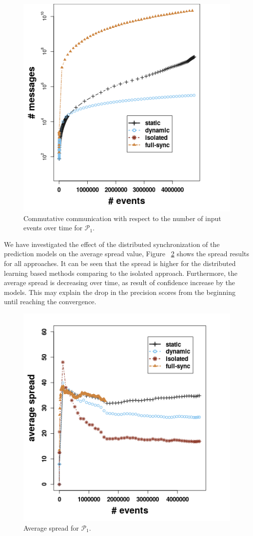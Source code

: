 \begin{center}
	
	\begin{figure}[h]
		
		\includegraphics[width=.5\textwidth]{figures/communication.png}
		
		\caption{Commutative communication with respect to the number of input events over time for $\mathcal{P}_1$.}
		\label{fig:comm}
	\end{figure}
\end{center}


We have investigated the effect of the distributed synchronization of the prediction models on the average spread value, Figure  ~\ref{fig:spread}  shows the spread results for all approaches. It can be seen that the spread is higher for the distributed learning based methods comparing to the isolated approach. Furthermore, the average spread is decreasing over time, as result of confidence increase by the models. This may explain the drop in the precision scores from the beginning until reaching the convergence. 

\begin{center}
	
	\begin{figure}[h]
		
		\includegraphics[width=.5\textwidth]{figures/spread_p1.png}
		
		\caption{Average spread for $\mathcal{P}_1$.}
		\label{fig:spread}
	\end{figure}
\end{center}




